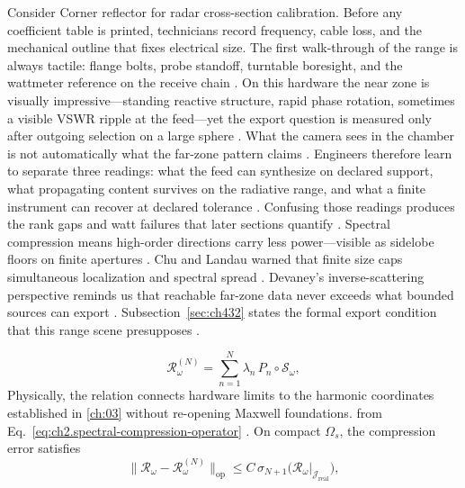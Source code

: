 \begin{physicalvignette}
Consider Corner reflector for radar cross-section calibration. Before any coefficient table is printed, technicians record frequency, cable loss, and the mechanical outline that fixes electrical size. The first walk-through of the range is always tactile: flange bolts, probe standoff, turntable boresight, and the wattmeter reference on the receive chain \cite{hansen1988}.
On this hardware the near zone is visually impressive---standing reactive structure, rapid phase rotation, sometimes a visible VSWR ripple at the feed---yet the export question is measured only after outgoing selection on a large sphere \cite{harrington2001}. What the camera sees in the chamber is not automatically what the far-zone pattern claims \cite{stratton1941}.
Engineers therefore learn to separate three readings: what the feed can synthesize on declared support, what propagating content survives on the radiative range, and what a finite instrument can recover at declared tolerance \cite{devaney2004}. Confusing those readings produces the rank gaps and watt failures that later sections quantify \cite{pal2026}.
Spectral compression means high-order directions carry less power---visible as sidelobe floors on finite apertures . 
Chu and Landau warned that finite size caps simultaneous localization and spectral spread \cite{chu1948}. Devaney's inverse-scattering perspective reminds us that reachable far-zone data never exceeds what bounded sources can export \cite{devaney2004}.
Subsection~\ref{sec:ch432} states the formal export condition that this range scene presupposes \cite{stratton1941}.
\end{physicalvignette}
\begin{equation}
\label{eq:ch4.compressed-radiation-operator}
\mathcal{R}_\omega^{(N)}
=
\sum_{n=1}^{N}\lambda_{n}\,P_{n}\circ\mathcal{S}_\omega,
\end{equation}
Physically, the relation connects hardware limits to the harmonic coordinates established in \ref{ch:03} without re-opening Maxwell foundations. \cite{hansen1988}
from Eq.~\eqref{eq:ch2.spectral-compression-operator} \cite{stratton1941}. On compact
\(\Omega_{s}\), the compression error satisfies
\begin{equation}
\label{eq:ch4.compression-error-import}
\|\mathcal{R}_\omega-\mathcal{R}_\omega^{(N)}\|_{\mathrm{op}}
\le
C\,\sigma_{N+1}\!\big(\mathcal{R}_\omega|_{\mathcal{J}_{\mathrm{real}}}\big),
\end{equation}
